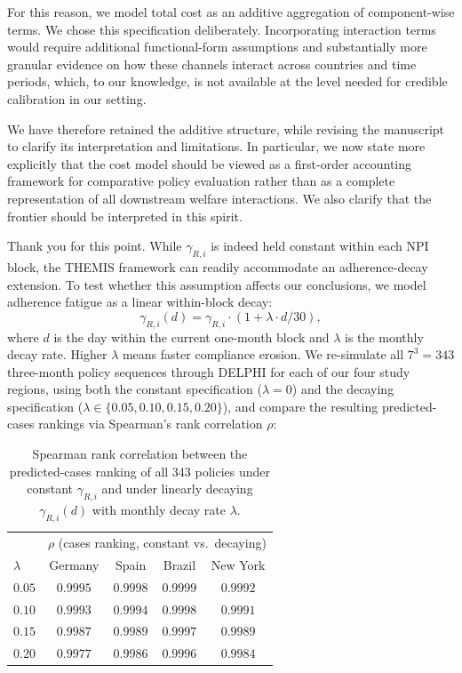 \documentclass[letterpaper,twoside,11pt]{reviewresponse}
\begin{document}
For this reason, we model total cost as an additive aggregation of component-wise terms. We chose this specification deliberately. Incorporating interaction terms would require additional functional-form assumptions and substantially more granular evidence on how these channels interact across countries and time periods, which, to our knowledge, is not available at the level needed for credible calibration in our setting.

We have therefore retained the additive structure, while revising the manuscript to clarify its interpretation and limitations. In particular, we now state more explicitly that the cost model should be viewed as a first-order accounting framework for comparative policy evaluation rather than as a complete representation of all downstream welfare interactions. We also clarify that the frontier should be interpreted in this spirit.


Thank you for this point. While $\gamma_{R,i}$ is indeed held constant within each NPI block, the THEMIS framework can readily accommodate an adherence-decay extension. To test whether this assumption affects our conclusions, we model adherence fatigue as a linear within-block decay:
\[
\gamma_{R,i}(d) = \gamma_{R,i}\cdot(1 + \lambda \cdot d/30),
\]
where $d$ is the day within the current one-month block and $\lambda$ is the monthly decay rate. Higher $\lambda$ means faster compliance erosion. We re-simulate all $7^3 = 343$ three-month policy sequences through DELPHI for each of our four study regions, using both the constant specification ($\lambda = 0$) and the decaying specification ($\lambda \in \{0.05, 0.10, 0.15, 0.20\}$), and compare the resulting predicted-cases rankings via Spearman's rank correlation $\rho$:

\begin{table}[h!]
\centering
\begin{tabular}{|l|cccc|}
\hline
& \multicolumn{4}{c|}{$\rho$ (cases ranking, constant vs.\ decaying)} \\
$\lambda$ & Germany & Spain & Brazil & New York \\\hline
$0.05$ & $0.9995$ & $0.9998$ & $0.9999$ & $0.9992$ \\
$0.10$ & $0.9993$ & $0.9994$ & $0.9998$ & $0.9991$ \\
$0.15$ & $0.9987$ & $0.9989$ & $0.9997$ & $0.9989$ \\
$0.20$ & $0.9977$ & $0.9986$ & $0.9996$ & $0.9984$ \\\hline
\end{tabular}
\caption{Spearman rank correlation between the predicted-cases ranking of all 343 policies under constant $\gamma_{R,i}$ and under linearly decaying $\gamma_{R,i}(d)$ with monthly decay rate $\lambda$.}
\label{tab:adherence_decay_rho}
\end{table}
\end{document}
